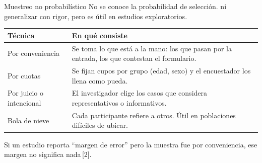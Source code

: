 \documentclass[aspectratio=169,10pt]{beamer}
\begin{document}
\begin{frame}{Muestreo no probabilístico}
  No se conoce la probabilidad de selección.  ni generalizar con rigor, pero es útil en estudios
  exploratorios.

  \vspace{0.2cm}
  \footnotesize
  \begin{center}
  \begin{tabular}{@{}p{2.8cm}p{8.4cm}@{}}
    \toprule
    \textbf{Técnica} & \textbf{En qué consiste} \\
    \midrule
    Por conveniencia & Se toma lo que está a la mano: los que pasan por la
      entrada, los que contestan el formulario. \\
    Por cuotas & Se fijan cupos por grupo (edad, sexo) y el encuestador los
      llena como pueda. \\
    Por juicio o intencional & El investigador elige los casos que considera
      representativos o informativos. \\
    Bola de nieve & Cada participante refiere a otros. Útil en poblaciones
      difíciles de ubicar. \\
    \bottomrule
  \end{tabular}
  \end{center}

  \vspace{0.15cm}
  {\scriptsize\color{uniGris} Si un estudio reporta ``margen de error'' pero la
  muestra fue por conveniencia, ese margen no significa nada\,[2].}
\end{frame}

\end{document}
